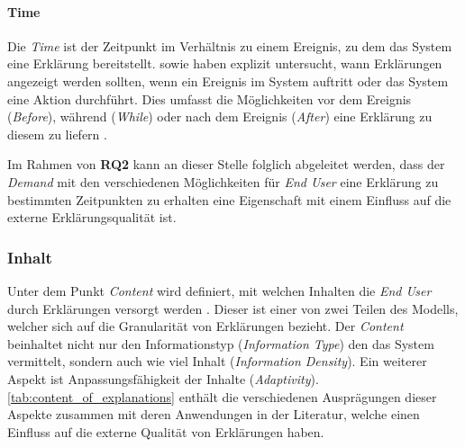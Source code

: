 \paragraph{Time} Die \textit{Time} ist der Zeitpunkt im Verhältnis zu einem Ereignis, zu dem das System eine Erklärung bereitstellt. \citeauthor{rosenfeld_explainability_2019} sowie \citeauthor{wiegand_id_2020} haben explizit untersucht, wann Erklärungen angezeigt werden sollten, wenn ein Ereignis im System auftritt oder das System eine Aktion durchführt. Dies umfasst die Möglichkeiten vor dem Ereignis (\textit{Before}), während (\textit{While}) oder nach dem Ereignis (\textit{After}) eine Erklärung zu diesem zu liefern \cite{rosenfeld_explainability_2019, wiegand_id_2020}.

\smallskip

Im Rahmen von \textbf{RQ2} kann an dieser Stelle folglich abgeleitet werden, dass der \textit{Demand} mit den verschiedenen Möglichkeiten für \textit{End User} eine Erklärung zu bestimmten Zeitpunkten zu erhalten eine Eigenschaft mit einem Einfluss auf die externe Erklärungsqualität ist.

\subsubsection{Inhalt}

Unter dem Punkt \textit{Content} wird definiert, mit welchen Inhalten die \textit{End User} durch Erklärungen versorgt werden \cite{nunes_systematic_2017}. Dieser ist einer von zwei Teilen des Modells, welcher sich auf die Granularität von Erklärungen bezieht. Der \textit{Content} beinhaltet nicht nur den Informationstyp (\textit{Information Type}) den das System vermittelt, sondern auch wie viel Inhalt (\textit{Information Density}). Ein weiterer Aspekt ist Anpassungsfähigkeit der Inhalte (\textit{Adaptivity}). \autoref{tab:content_of_explanations} enthält die verschiedenen Ausprägungen dieser Aspekte zusammen mit deren Anwendungen in der Literatur, welche einen Einfluss auf die externe Qualität von Erklärungen haben.

